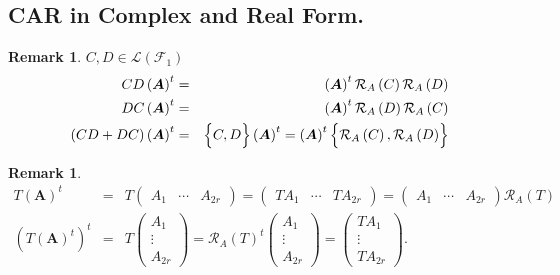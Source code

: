 \documentclass[aps,preprint]{revtex4}
\newtheorem{remark}[theorem]{Remark}
\begin{document}
\subsection{CAR in Complex and Real Form.}

\begin{remark}
$C,D\in \mathcal{L}\left( \mathcal{F}_{1}\right) $%
\begin{eqnarray}
CD\left( \boldsymbol{A}\right) ^{t} &=&\left( \boldsymbol{A}\right) ^{t}%
\mathcal{R}_{A}\left( C\right) \mathcal{R}_{A}\left( D\right) \\
DC\left( \boldsymbol{A}\right) ^{t} &=&\left( \boldsymbol{A}\right) ^{t}%
\mathcal{R}_{A}\left( D\right) \mathcal{R}_{A}\left( C\right) \\
\left( CD+DC\right) \left( \boldsymbol{A}\right) ^{t} &=&\left\{ \overset{}{%
C,D}\right\} \left( \boldsymbol{A}\right) ^{t}=\left( \boldsymbol{A}\right)
^{t}\left\{ \overset{}{\mathcal{R}_{A}\left( C\right) ,\mathcal{R}_{A}\left(
D\right) }\right\}
\end{eqnarray}
\end{remark}

\begin{remark}
\begin{eqnarray}
T\left( \boldsymbol{A}\right) ^{t} &=&T\left( 
\begin{array}{ccc}
A_{1} & \cdots & A_{2r}%
\end{array}%
\right) =\left( 
\begin{array}{ccc}
TA_{1} & \cdots & TA_{2r}%
\end{array}%
\right) =\left( 
\begin{array}{ccc}
A_{1} & \cdots & A_{2r}%
\end{array}%
\right) \mathcal{R}_{A}\left( T\right) \\
\left( T\left( \boldsymbol{A}\right) ^{t}\right) ^{t} &=&T\left( 
\begin{array}{c}
A_{1} \\ 
\vdots \\ 
A_{2r}%
\end{array}%
\right) =\mathcal{R}_{A}\left( T\right) ^{t}\left( 
\begin{array}{c}
A_{1} \\ 
\vdots \\ 
A_{2r}%
\end{array}%
\right) =\left( 
\begin{array}{c}
TA_{1} \\ 
\vdots \\ 
TA_{2r}%
\end{array}%
\right) .
\end{eqnarray}
\end{remark}
\end{document}
